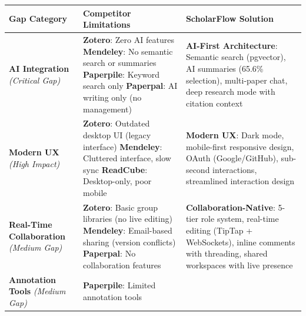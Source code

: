 \begin{table}[H]
    \centering
    \scriptsize
    \begin{tabularx}{\textwidth}{|p{3.4cm}|X|X|}
        \hline
        \textbf{Gap Category}                                           & \textbf{Competitor Limitations} & \textbf{ScholarFlow Solution}                                  \\
        \hline
        {\bfseries AI Integration} \newline \textit{(Critical Gap)}     &
        {\bfseries Zotero}: Zero AI features \newline
        {\bfseries Mendeley}: No semantic search or summaries \newline
        {\bfseries Paperpile}: Keyword search only \newline
        {\bfseries Paperpal}: AI writing only (no management)           &
        {\bfseries AI-First Architecture}: Semantic search (pgvector), AI summaries (65.6\% selection), multi-paper chat, deep research mode with citation context         \\
        \hline
        {\bfseries Modern UX} \newline \textit{(High Impact)}           &
        {\bfseries Zotero}: Outdated desktop UI (legacy interface) \newline
        {\bfseries Mendeley}: Cluttered interface, slow sync \newline
        {\bfseries ReadCube}: Desktop-only, poor mobile                 &
        {\bfseries Modern UX}: Dark mode, mobile-first responsive design, OAuth (Google/GitHub), sub-second interactions, streamlined interaction design                   \\
        \hline
        \textbf{Real-Time Collaboration} \newline \textit{(Medium Gap)} &
        \textbf{Zotero}: Basic group libraries (no live editing) \newline
        \textbf{Mendeley}: Email-based sharing (version conflicts) \newline
        \textbf{Paperpal}: No collaboration features                    &
        \textbf{Collaboration-Native}: 5-tier role system, real-time editing (TipTap + WebSockets), inline comments with threading, shared workspaces with live presence   \\
        \hline
        \textbf{Annotation Tools} \newline \textit{(Medium Gap)}        &
        \textbf{Paperpile}: Limited annotation tools \newline

\end{tabularx}
\end{table}
